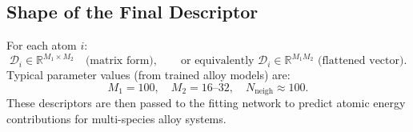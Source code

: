 \documentclass[12pt,a4paper]{article}
\begin{document}
\subsection*{Shape of the Final Descriptor}

For each atom $i$:
\[
\mathcal{D}_i \in \mathbb{R}^{M_1 \times M_2} \quad \text{(matrix form)}, \qquad
\text{or equivalently } \mathcal{D}_i \in \mathbb{R}^{M_1 M_2} \text{ (flattened vector)}.
\]
Typical parameter values (from trained alloy models) are:
\[
M_1 = 100, \quad M_2 = 16\text{--}32, \quad N_{\mathrm{neigh}} \approx 100.
\]
These descriptors are then passed to the fitting network to predict atomic energy contributions for multi-species alloy systems.
\end{document}
